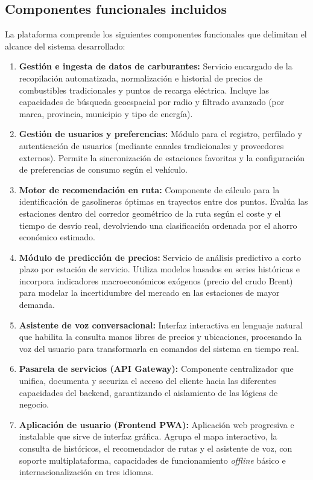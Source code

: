 \subsection{Componentes funcionales incluidos}

La plataforma comprende los siguientes componentes funcionales que delimitan el alcance del sistema desarrollado:

\begin{enumerate}
      \item \textbf{Gestión e ingesta de datos de carburantes:} Servicio encargado de la recopilación automatizada, normalización e historial de precios de combustibles tradicionales y puntos de recarga eléctrica. Incluye las capacidades de búsqueda geoespacial por radio y filtrado avanzado (por marca, provincia, municipio y tipo de energía).
      \item \textbf{Gestión de usuarios y preferencias:} Módulo para el registro, perfilado y autenticación de usuarios (mediante canales tradicionales y proveedores externos). Permite la sincronización de estaciones favoritas y la configuración de preferencias de consumo según el vehículo.
      \item \textbf{Motor de recomendación en ruta:} Componente de cálculo para la identificación de gasolineras óptimas en trayectos entre dos puntos. Evalúa las estaciones dentro del corredor geométrico de la ruta según el coste y el tiempo de desvío real, devolviendo una clasificación ordenada por el ahorro económico estimado.
      \item \textbf{Módulo de predicción de precios:} Servicio de análisis predictivo a corto plazo por estación de servicio. Utiliza modelos basados en series históricas e incorpora indicadores macroeconómicos exógenos (precio del crudo Brent) para modelar la incertidumbre del mercado en las estaciones de mayor demanda.
      \item \textbf{Asistente de voz conversacional:} Interfaz interactiva en lenguaje natural que habilita la consulta manos libres de precios y ubicaciones, procesando la voz del usuario para transformarla en comandos del sistema en tiempo real.
      \item \textbf{Pasarela de servicios (API Gateway):} Componente centralizador que unifica, documenta y securiza el acceso del cliente hacia las diferentes capacidades del backend, garantizando el aislamiento de las lógicas de negocio.
      \item \textbf{Aplicación de usuario (Frontend PWA):} Aplicación web progresiva e instalable que sirve de interfaz gráfica. Agrupa el mapa interactivo, la consulta de históricos, el recomendador de rutas y el asistente de voz, con soporte multiplataforma, capacidades de funcionamiento \textit{offline} básico e internacionalización en tres idiomas.
\end{enumerate}


